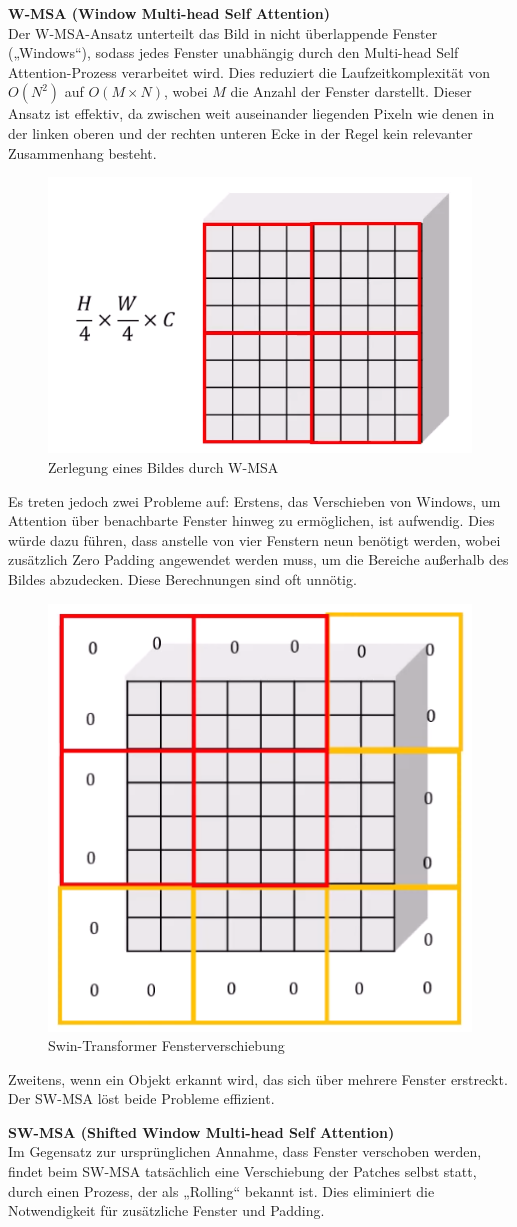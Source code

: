 \documentclass[12pt,a4paper,twoside]{article}
\begin{document}
\textbf{W-MSA (Window Multi-head Self Attention)}\\
Der W-MSA-Ansatz unterteilt das Bild in nicht überlappende Fenster („Windows“), sodass jedes Fenster unabhängig durch den Multi-head Self Attention-Prozess verarbeitet wird. Dies reduziert die Laufzeitkomplexität von \(O(N^2)\) auf \(O(M \times N)\), wobei \(M\) die Anzahl der Fenster darstellt. Dieser Ansatz ist effektiv, da zwischen weit auseinander liegenden Pixeln wie denen in der linken oberen und der rechten unteren Ecke in der Regel kein relevanter Zusammenhang besteht.

\begin{figure}[H]
    \centering
    \includegraphics[width=0.25\linewidth]{SWIN-Transformer-WMSA.png}
    \caption{Zerlegung eines Bildes durch W-MSA}
    \label{fig:wmsa}
\end{figure}

Es treten jedoch zwei Probleme auf: Erstens, das Verschieben von Windows, um Attention über benachbarte Fenster hinweg zu ermöglichen, ist aufwendig. Dies würde dazu führen, dass anstelle von vier Fenstern neun benötigt werden, wobei zusätzlich Zero Padding angewendet werden muss, um die Bereiche außerhalb des Bildes abzudecken. Diese Berechnungen sind oft unnötig.

\begin{figure}[H]
    \centering
    \includegraphics[width=0.3\linewidth]{SWIN-Transformer-Padding.png}
    \caption{Swin-Transformer Fensterverschiebung}
    \label{fig:window_shift}
\end{figure}

Zweitens, wenn ein Objekt erkannt wird, das sich über mehrere Fenster erstreckt. Der SW-MSA löst beide Probleme effizient.

\textbf{SW-MSA (Shifted Window Multi-head Self Attention)}\\
Im Gegensatz zur ursprünglichen Annahme, dass Fenster verschoben werden, findet beim SW-MSA tatsächlich eine Verschiebung der Patches selbst statt, durch einen Prozess, der als „Rolling“ bekannt ist. Dies eliminiert die Notwendigkeit für zusätzliche Fenster und Padding.
\end{document}
